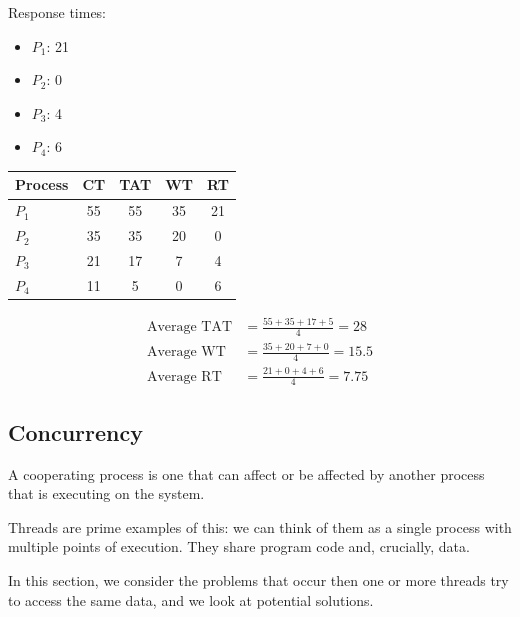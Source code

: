 \documentclass[a4paper, 10pt]{article}
\begin{document}
\begin{examplebox}{}{}
\begin{minipage}[t]{0.48\textwidth}
        Response times:
        \begin{itemize}
            \item $P_1$: 21
            \item $P_2$: 0
            \item $P_3$: 4
            \item $P_4$: 6
        \end{itemize}
    \end{minipage}
    \hfill
    \begin{minipage}[t]{0.48\textwidth}
        \begin{center}
            \begin{tabular}{@{} l c c c c @{}}
                \toprule
                Process & CT & TAT & WT & RT \\
                \midrule
                $P_1$   & 55 & 55  & 35 & 21 \\
                $P_2$   & 35 & 35  & 20 & 0  \\
                $P_3$   & 21 & 17  & 7  & 4  \\
                $P_4$   & 11 & 5   & 0  & 6  \\
                \bottomrule
            \end{tabular}
        \end{center}

        \begin{align*}
            \text{Average TAT} & = \frac{55 + 35 + 17 + 5}{4} = 28  \\
            \text{Average WT}  & = \frac{35 + 20 + 7 + 0}{4} = 15.5 \\
            \text{Average RT}  & = \frac{21 + 0 + 4 + 6}{4} = 7.75
        \end{align*}
    \end{minipage}

\end{examplebox}

\pagebreak
\subsection{Concurrency}
A cooperating process is one that can affect or be affected by another process that is executing on the system.

Threads are prime examples of this: we can think of them as a single process with multiple points of execution. They share program code and, crucially, data.

In this section, we consider the problems that occur then one or more threads try to access the same data, and we look at potential solutions.
\end{document}
